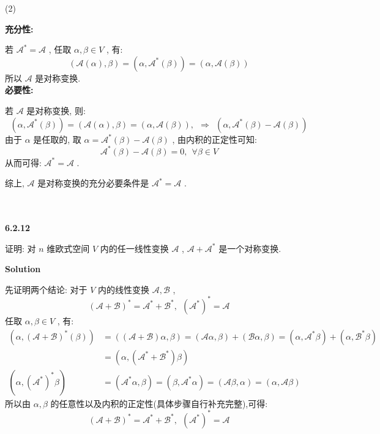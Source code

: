 \documentclass[11pt,a4paper,openany,oneside]{book}
\newcommand\Solution{\noindent\textbf{\textsf{Solution}}\par\medskip}
\begin{document}
(2)

\textbf{充分性:}

若 $ \mathcal{A}^* = \mathcal{A} $ , 任取 $ \alpha, \beta \in V $ , 有:
 $$  (\mathcal{A}(\alpha), \beta) = (\alpha, \mathcal{A}^*(\beta)) = (\alpha, \mathcal{A}(\beta))  $$ 
所以 $ \mathcal{A} $ 是对称变换. \\

\textbf{必要性:}

若 $ \mathcal{A} $ 是对称变换, 则:
 $$  (\alpha, \mathcal{A}^*(\beta)) = (\mathcal{A}(\alpha), \beta) = (\alpha, \mathcal{A}(\beta)), \ \ \Rightarrow \ \ (\alpha, \mathcal{A}^*(\beta) - \mathcal{A}(\beta))  $$ 
由于 $ \alpha $ 是任取的, 取 $ \alpha = \mathcal{A}^*(\beta) - \mathcal{A}(\beta)  $ , 由内积的正定性可知:
 $$  \mathcal{A}^*(\beta) - \mathcal{A}(\beta) = 0, \ \ \forall \beta \in V  $$ 
从而可得:  $ \mathcal{A}^* = \mathcal{A} $ .

综上,  $ \mathcal{A} $ 是对称变换的充分必要条件是 $ \mathcal{A}^* = \mathcal{A} $ . \\  \\  \\







\begin{myexample}
	\textbf{6.2.12}

证明: 对 $ n $ 维欧式空间 $ V $ 内的任一线性变换 $ \mathcal{A} $ ,  $ \mathcal{A}+\mathcal{A}^* $ 是一个对称变换. \\

\end{myexample}
\Solution 

先证明两个结论: 对于 $ V $ 内的线性变换 $ \mathcal{A}, \mathcal{B} $ ,
 $$  (\mathcal{A}+\mathcal{B})^* = \mathcal{A}^* + \mathcal{B}^*, \ \ (\mathcal{A}^*)^* = \mathcal{A}  $$ 
任取 $ \alpha, \beta \in V $ , 有:
\begin{align*}
(\alpha, (\mathcal{A}+\mathcal{B})^*(\beta)) &= ((\mathcal{A+B})\alpha, \beta) = (\mathcal{A}\alpha, \beta) + (\mathcal{B}\alpha, \beta) = (\alpha, \mathcal{A}^*\beta) + (\alpha, \mathcal{B}^*\beta) \\
&= (\alpha, (\mathcal{A}^* + \mathcal{B}^*)\beta) \\ 
(\alpha, (\mathcal{A}^*)^*\beta) &= (\mathcal{A}^*\alpha, \beta) = (\beta, \mathcal{A}^*\alpha) = (\mathcal{A}\beta, \alpha) = (\alpha, \mathcal{A}\beta) 
\end{align*}
所以由 $ \alpha, \beta $ 的任意性以及内积的正定性(具体步骤自行补充完整),可得: 
 $$ (\mathcal{A}+\mathcal{B})^* = \mathcal{A}^* + \mathcal{B}^*, \ \ (\mathcal{A}^*)^* = \mathcal{A} $$ 
\end{document}
